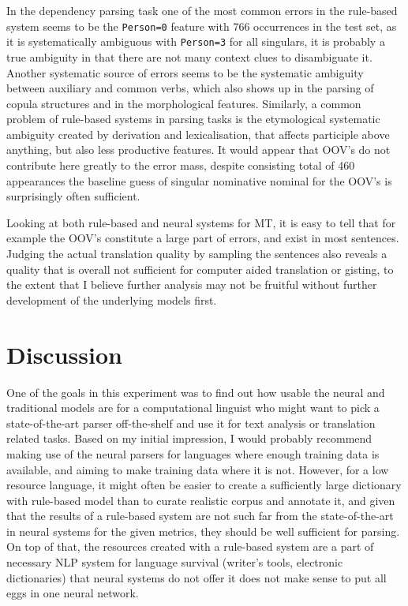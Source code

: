\documentclass{flammie}
\begin{document}
In the dependency parsing task one of the most common errors in the rule-based
system seems to be the \texttt{Person=0} feature with 766 occurrences in the
test set, as it is systematically ambiguous with \texttt{Person=3} for all
singulars, it is probably a true ambiguity in that there are not many context
clues to disambiguate it. Another systematic source of errors seems to be the
systematic ambiguity between auxiliary and common verbs, which also shows up in
the parsing of copula structures and in the morphological features. Similarly, a
common problem of rule-based systems in parsing tasks is the etymological
systematic ambiguity created by derivation and lexicalisation, that affects
participle above anything, but also less productive features. It would appear
that OOV's do not contribute here greatly to the error mass, despite consisting
total of 460 appearances the baseline guess of singular nominative nominal for
the OOV's is surprisingly often sufficient.

Looking at both rule-based and neural systems for MT, it is easy to
tell that for example the OOV's constitute a large part of errors, and
exist in most sentences. Judging the actual translation quality by
sampling the sentences also reveals a quality that is overall not sufficient
for computer aided translation or gisting, to the extent that I believe
further analysis may not be fruitful without further development of the
underlying models first.

\section{Discussion}
\label{sec:discussion}

One of the goals in this experiment was to find out how usable the neural and
traditional models are for a computational linguist who might want to pick a
state-of-the-art parser off-the-shelf and use it for text analysis or
translation related tasks. Based on my initial impression, I would probably
recommend making use of the neural parsers for languages where enough training
data is available, and aiming to make training data where it is not. However,
for a low resource language, it might often be easier to create a sufficiently
large dictionary with rule-based model than to curate realistic corpus and
annotate it, and given that the results of a rule-based system are not such far
from the state-of-the-art in neural systems for the given metrics, they should
be well sufficient for parsing. On top of that, the resources created with a
rule-based system are a part of necessary NLP system for language survival
(writer's tools, electronic dictionaries) that neural systems do not offer it
does not make sense to put all eggs in one neural network.
\end{document}
